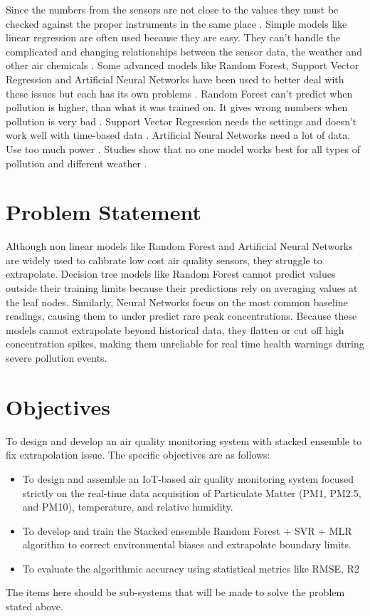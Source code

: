 Since the numbers from the sensors are not close to the values they must be checked against the proper instruments in the same place \cite{Concas_2021,Hayward_2024}. Simple models like linear regression are often used because they are easy. They can't handle the complicated and changing relationships between the sensor data, the weather and other air chemicals \cite{Hayward_2024}. Some advanced models like Random Forest, Support Vector Regression and Artificial Neural Networks have been used to better deal with these issues but each has its own problems \cite{Concas_2021,Hayward_2024}. Random Forest can't predict when pollution is higher, than what it was trained on. It gives wrong numbers when pollution is very bad \cite{Hayward_2024}. Support Vector Regression needs the settings and doesn't work well with time-based data \cite{Concas_2021,Hayward_2024}. Artificial Neural Networks need a lot of data. Use too much power \cite{Concas_2021,Hayward_2024}. Studies show that no one model works best for all types of pollution and different weather \cite{Concas_2021,Hayward_2024}.
\section{Problem Statement}
Although non linear models like Random Forest and Artificial Neural Networks are widely used to calibrate low cost air quality sensors, they struggle to extrapolate. Decision tree models like Random Forest cannot predict values outside their training limits because their predictions rely on averaging values at the leaf nodes. Similarly, Neural Networks focus on the most common baseline readings, causing them to under predict rare peak concentrations. Because these models cannot extrapolate beyond historical data, they flatten or cut off high concentration spikes, making them unreliable for real time health warnings during severe pollution events.
\section{Objectives}
To design and develop an air quality monitoring system with stacked ensemble to fix extrapolation issue. The specific objectives are as follows: 
\begin{itemize}
\item To design and assemble an IoT-based air quality monitoring system focused strictly on the real-time data acquisition of Particulate Matter (PM1, PM2.5, and PM10), temperature, and relative humidity.  
\item To develop and train the Stacked ensemble Random Forest + SVR + MLR algorithm to correct environmental biases and extrapolate boundary limits.  
\item To evaluate the algorithmic accuracy using statistical metrics like RMSE, R2 
\end{itemize}
The items here should be sub-systems that will be made to solve the problem stated above.
